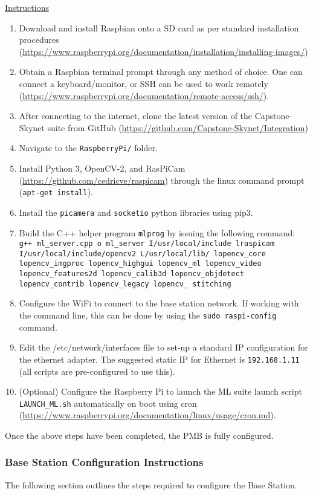 \documentclass[10pt,letterpaper]{article}
\begin{document}
\underline{Instructions}
\begin{enumerate}
\item Download and install Raspbian onto a SD card as per standard installation procedures (\url{https://www.raspberrypi.org/documentation/installation/installing-images/})
\item Obtain a Raspbian terminal prompt through any method of choice. One can connect a keyboard/monitor, or SSH can be used to work remotely (\url{https://www.raspberrypi.org/documentation/remote-access/ssh/}).
\item After connecting to the internet, clone the latest version of the Capstone-Skynet suite from GitHub (\url{https://github.com/Capstone-Skynet/Integration})
\item Navigate to the \texttt{RaspberryPi/} folder.
\item Install Python 3, OpenCV-2, and RasPiCam (\url{https://github.com/cedricve/raspicam}) through the linux command prompt (\texttt{apt-get install}). 
\item Install the \texttt{picamera} and \texttt{socketio} python libraries using pip3.
\item Build the C++ helper program \texttt{mlprog} by issuing the following command: \texttt{g++ ml\_server.cpp \-o ml\_server \-I/usr/local/include \-lraspicam \-I/usr/local/include/opencv2 \-L/usr/local/lib/ \-lopencv\_core \-lopencv\_imgproc \-lopencv\_highgui \-lopencv\_ml \-lopencv\_video \-lopencv\_features2d \-lopencv\_calib3d \-lopencv\_objdetect \-lopencv\_contrib \-lopencv\_legacy \-lopencv\_ stitching}
\item Configure the WiFi to connect to the base station network. If working with the command line, this can be done by using the \texttt{sudo raspi-config} command.
\item Edit the /etc/network/interfaces file to set-up a standard IP configuration for the ethernet adapter. The suggested static IP for Ethernet is \texttt{192.168.1.11}  (all scripts are pre-configured to use this).
\item (Optional) Configure the Raspberry Pi to launch the ML suite launch script \texttt{LAUNCH\_ML.sh} automatically on boot using cron (\url{https://www.raspberrypi.org/documentation/linux/usage/cron.md}).
\end{enumerate}

Once the above steps have been completed, the PMB is fully configured.

\subsubsection{Base Station Configuration Instructions}
\label{bs_inst}
The following section outlines the steps required to configure the Base Station. 
\end{document}
